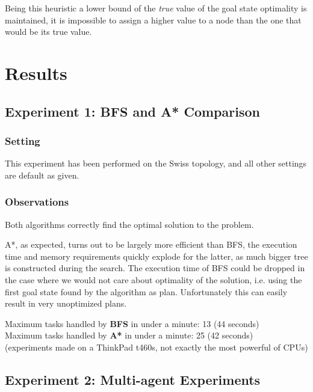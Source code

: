 \documentclass[11pt]{article}
\begin{document}
Being this heuristic a lower bound of the \textit{true} value of the goal state optimality is maintained, it is impossible to assign a higher value to a node than the one that would be its true value.


\section{Results}

\subsection{Experiment 1: BFS and A* Comparison}

\subsubsection{Setting}

This experiment has been performed on the Swiss topology, and all other settings are default as given.

\subsubsection{Observations}
Both algorithms correctly find the optimal solution to the problem.

A*, as expected, turns out to be largely more efficient than BFS, the execution time and memory requirements quickly explode for the latter, as much bigger tree is constructed during the search.
The execution time of BFS could be dropped in the case where we would not care about optimality of the solution, i.e. using the first goal state found by the algorithm as plan. Unfortunately this can easily result in very unoptimized plans.

Maximum tasks handled by \textbf{BFS} in under a minute: 13 (44 seconds)\\
Maximum tasks handled by \textbf{A*} in under a minute: 25 (42 seconds)\\
(experiments made on a ThinkPad t460s, not exactly the most powerful of CPUs)



\subsection{Experiment 2: Multi-agent Experiments}
\end{document}
